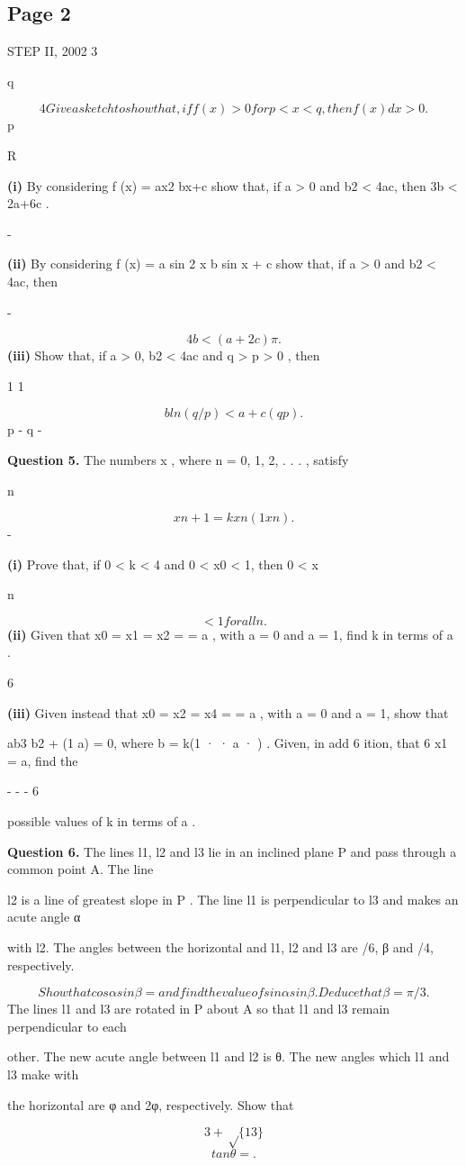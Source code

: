 \documentclass[12pt]{article}
\begin{document}
\subsection*{Page 2}
\begin{flushleft}
STEP II, 2002 3\par
q\par
\[4 Give a sketch to show that, if f (x) > 0 for p < x < q , then f (x) dx > 0 .\]
p\par
R\par
\textbf{(i)} By considering f (x) = ax2 bx+c show that, if a > 0 and b2 < 4ac, then 3b < 2a+6c .\par
-\par
\textbf{(ii)} By considering f (x) = a sin 2 x b sin x + c show that, if a > 0 and b2 < 4ac, then\par
-\par
\[4b < (a + 2c)\pi .\]
\textbf{(iii)} Show that, if a > 0, b2 < 4ac and q > p > 0 , then\par
1 1\par
\[b ln(q/p) < a + c(q p) .\]
p - q -\par
\lambda \mu\par
\bigskip\textbf{Question 5.} The numbers x , where n = 0, 1, 2, . . . , satisfy\par
n\par
\[x n+1 = kx n (1 x n ) .\]
-\par
\textbf{(i)} Prove that, if 0 < k < 4 and 0 < x0 < 1, then 0 < x\par
n\par
\[< 1 for all n .\]
\textbf{(ii)} Given that x0 = x1 = x2 = = a , with a = 0 and a = 1, find k in terms of a .\par
{} 6\par
\textbf{(iii)} Given instead that x0 = x2 = x4 = = a , with a = 0 and a = 1, show that\par
ab3 b2 + (1 a) = 0, where b = k(1 · · a · ) . Given, in add 6 ition, that 6 x1 = a, find the\par
- - - 6\par
possible values of k in terms of a .\par
\bigskip\textbf{Question 6.} The lines l1, l2 and l3 lie in an inclined plane P and pass through a common point A. The line\par
l2 is a line of greatest slope in P . The line l1 is perpendicular to l3 and makes an acute angle α\par
with l2. The angles between the horizontal and l1, l2 and l3 are \pi/6, β and \pi/4, respectively.\par
\[Show that cos α sin β = and find the value of sin α sin β . Deduce that β = \pi/3 .\]
The lines l1 and l3 are rotated in P about A so that l1 and l3 remain perpendicular to each\par
other. The new acute angle between l1 and l2 is θ. The new angles which l1 and l3 make with\par
the horizontal are φ and 2φ, respectively. Show that\par
\[3 + \sqrt\{13\}\]
\[tan θ = .\]
\end{flushleft}
\end{document}
